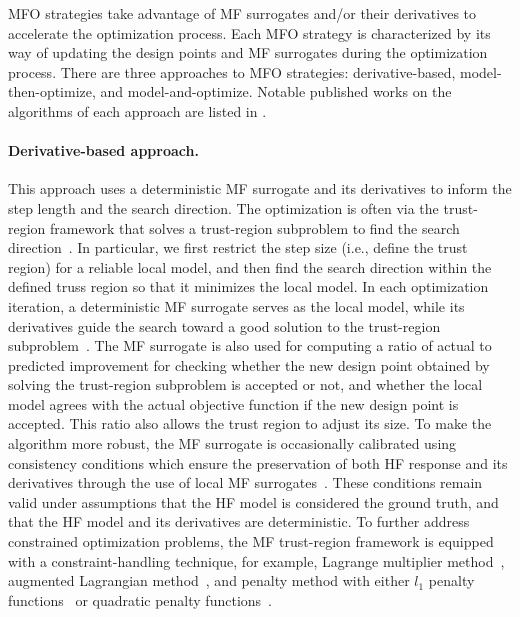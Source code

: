 \documentclass[iicol,sn-basic]{sn-jnl}%
\begin{document}
MFO strategies take advantage of MF surrogates and/or their derivatives to accelerate the optimization process.
Each MFO strategy is characterized by its way of updating the design points and MF surrogates during the optimization process.
There are three approaches to MFO strategies: derivative-based, model-then-optimize, and model-and-optimize.
Notable published works on the algorithms of each approach are listed in .

\paragraph{Derivative-based approach.}
This approach uses a deterministic MF surrogate and its derivatives to inform the step length and the search direction. 
The optimization is often via the trust-region framework that solves a trust-region subproblem to find the search direction~\citep{Nocedal2006}.
In particular, we first restrict the step size (i.e., define the trust region) for a reliable local model, and then find the search direction within the defined truss region so that it minimizes the local model.
In each optimization iteration, a deterministic MF surrogate serves as the local model, while its derivatives guide the search toward a good solution to the trust-region subproblem~\citep{Alexandrov1998,Alexandrov2001,Robinson2008}.
The MF surrogate is also used for computing a ratio of actual to predicted improvement for checking whether the new design point obtained by solving the  trust-region subproblem is accepted or not, and whether the local model agrees with the actual objective function if the new design point is accepted.
This ratio also allows the trust region to adjust its size.
To make the algorithm more robust, the MF surrogate is occasionally
calibrated using consistency conditions which ensure the preservation of both HF response and its derivatives through the use of local MF surrogates~\citep{Alexandrov1998,Alexandrov2001}.
These conditions remain valid under assumptions that the HF model is considered the ground truth, and that the HF model and its derivatives are deterministic.
To further address constrained optimization problems, the MF trust-region framework is equipped with a constraint-handling technique, for example, Lagrange multiplier method~\citep{Robinson2008,March2011}, augmented Lagrangian method~\citep{Alexandrov2001}, and penalty method with either $l_1$ penalty functions~\citep{Alexandrov2001,Gano2005} or quadratic penalty functions~\citep{Elham2015}.
\end{document}
